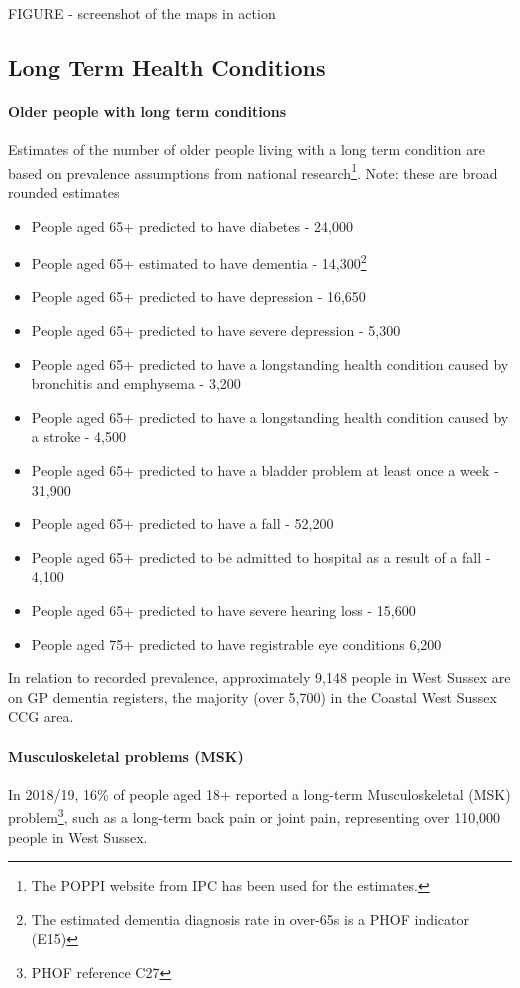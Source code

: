 FIGURE - screenshot of the maps in action

\subsection{Long Term Health Conditions}
\paragraph{Older people with long term conditions} Estimates of the number of older people living with a long term condition are based on prevalence assumptions from national research\footnote{The POPPI website from IPC has been used for the estimates.}. Note: these are broad rounded estimates

\begin{itemize}[noitemsep]
    \item People aged 65+ predicted to have diabetes - 24,000
    \item People aged 65+ estimated to have dementia - 14,300\footnote{The estimated dementia diagnosis rate in over-65s is a PHOF indicator (E15)}
    \item People aged 65+ predicted to have depression - 16,650
    \item People aged 65+ predicted to have severe depression - 5,300
    \item People aged 65+ predicted to have a longstanding health condition caused by bronchitis and emphysema - 3,200
    \item People aged 65+ predicted to have a longstanding health condition caused by a stroke - 4,500
    \item People aged 65+ predicted to have a bladder problem at least once a week - 31,900
    \item People aged 65+ predicted to have a fall - 52,200
    \item People aged 65+ predicted to be admitted to hospital as a result of a fall - 4,100
    \item People aged 65+ predicted to have severe hearing loss - 15,600
    \item People aged 75+ predicted to have registrable eye conditions 6,200
\end{itemize}

In relation to recorded prevalence, approximately 9,148 people in West Sussex are on GP dementia registers, the majority (over 5,700) in the Coastal West Sussex CCG area.

\paragraph{Musculoskeletal problems (MSK)} In 2018/19, 16\% of people aged 18+ reported a long-term Musculoskeletal (MSK) problem\footnote{PHOF reference C27}, such as a long-term back pain or joint pain, representing over 110,000 people in West Sussex.

